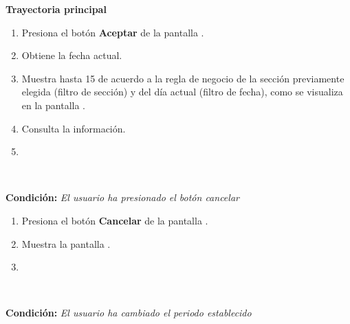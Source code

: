 

\begin{large}
	\textbf{Trayectoria principal}\\
\end{large}	

\begin{enumerate}[1.]

	\item \actor Presiona el botón 	\textbf{Aceptar} de la pantalla . 


	\item \sistema Obtiene la fecha actual.

	\item \sistema Muestra hasta 15 de acuerdo a la regla de negocio  de la sección previamente elegida (filtro de sección) y del día actual (filtro de fecha), como se visualiza en la pantalla .

	\item \actor \label{CU4:Consulta}Consulta la información.

	\item \finCU	
\end{enumerate}


\begin{large}
	\\
\end{large}	
\textbf{Condición:} \textit{El usuario ha presionado el botón cancelar}

\begin{enumerate}[{A-}1.]

	\item \actor Presiona el botón \textbf{Cancelar} de la pantalla .

	\item \sistema Muestra la pantalla .

	\item \finTA

\end{enumerate}


\begin{large}
	\\
\end{large}	
\textbf{Condición:} \textit{El usuario ha cambiado el periodo establecido}

